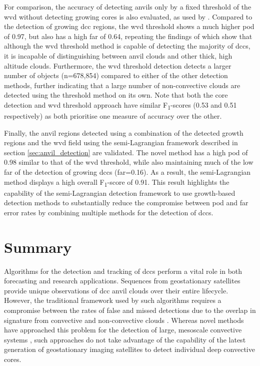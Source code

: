 For comparison, the accuracy of detecting anvils only by a fixed threshold of the \acrshort{wvd} without detecting growing cores is also evaluated, as used by \citet{muller_role_2018}.
Compared to the detection of growing \acrshort{dcc} regions, the \acrshort{wvd} threshold shows a much higher \acrshort{pod} of 0.97, but also has a high \acrshort{far} of 0.64, repeating the findings of \citet{muller_novel_2019} which show that although the \acrshort{wvd} threshold method is capable of detecting the majority of \acrshort{dcc}s, it is incapable of distinguishing between anvil clouds and other thick, high altitude clouds.
Furthermore, the \acrshort{wvd} threshold detection detects a larger number of objects (n=678,854) compared to either of the other detection methods, further indicating that a large number of non-convective clouds are detected using the threshold method on its own.
Note that both the core detection and \acrshort{wvd} threshold approach have similar F\textsubscript{1}-scores (0.53 and 0.51 respectively) as both prioritise one measure of accuracy over the other.

Finally, the anvil regions detected using a combination of the detected growth regions and the \acrshort{wvd} field using the semi-Lagrangian framework described in section \ref{sec:anvil_detection} are validated.
The novel method has a high \acrshort{pod} of 0.98 similar to that of the \acrshort{wvd} threshold, while also maintaining much of the low \acrshort{far} of the detection of growing \acrshort{dcc}s (\acrshort{far}=0.16).
As a result, the semi-Lagrangian method displays a high overall F\textsubscript{1}-score of 0.91.
This result highlights the capability of the semi-Lagrangian detection framework to use growth-based detection methods to substantially reduce the compromise between \acrshort{pod} and \acrshort{far} error rates by combining multiple methods for the detection of \acrshort{dcc}s.


\section{Summary}  %

Algorithms for the detection and tracking of \acrshort{dcc}s perform a vital role in both forecasting and research applications.
Sequences from geostationary satellites provide unique observations of \acrshort{dcc} anvil clouds over their entire lifecycle.
However, the traditional framework used by such algorithms requires a compromise between the rates of false and missed detections due to the overlap in signature from convective and non-convective clouds \citep{konduru_new_2013}.
Whereas novel methods have approached this problem for the detection of large, mesoscale convective systems \citep{fiolleau_algorithm_2013}, such approaches do not take advantage of the capability of the latest generation of geostationary imaging satellites to detect individual deep convective cores.

